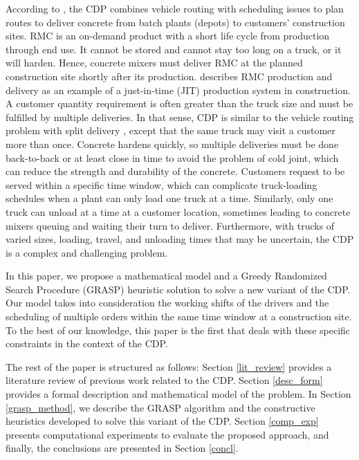 \documentclass{article}
\begin{document}
According to \cite{blazewicz2019handbook}, the CDP combines vehicle routing with scheduling issues to plan routes to deliver concrete from batch plants (depots) to customers' construction sites. RMC is an on-demand product with a short life cycle from production through end use. It cannot be stored and cannot stay too long on a truck, or it will harden. Hence, concrete mixers must deliver RMC at the planned construction site shortly after its production. \cite{tommelein1999just} describes RMC production and delivery as an example of a just-in-time (JIT) production system in construction. A customer quantity requirement is often greater than the truck size and must be fulfilled by multiple deliveries. In that sense, CDP is similar to the vehicle routing problem with split delivery \citep{archetti2008split}, except that the same truck may visit a customer more than once. Concrete hardens quickly, so multiple deliveries must be done back-to-back or at least close in time to avoid the problem of cold joint, which can reduce the strength and durability of the concrete. Customers request to be served within a specific time window, which can complicate truck-loading schedules when a plant can only load one truck at a time. Similarly, only one truck can unload at a time at a customer location, sometimes leading to concrete mixers queuing and waiting their turn to deliver. Furthermore, with trucks of varied sizes, loading, travel, and unloading times that may be uncertain, the CDP is a complex and challenging problem.

In this paper, we propose a mathematical model and a Greedy Randomized Search Procedure (GRASP) heuristic solution to solve a new variant of the CDP. Our model takes into consideration the working shifts of the drivers and the scheduling of multiple orders within the same time window at a construction site. To the best of our knowledge, this paper is the first that deals with these specific constraints in the context of the CDP.

The rest of the paper is structured as follows: Section \ref{lit_review} provides a literature review of previous work related to the CDP. Section \ref{desc_form} provides a formal description and mathematical model of the problem. In Section \ref{grasp_method}, we describe the GRASP algorithm and the constructive heuristics developed to solve this variant of the CDP. Section \ref{comp_exp} presents computational experiments to evaluate the proposed approach, and finally, the conclusions are presented in Section \ref{concl}.
\end{document}

